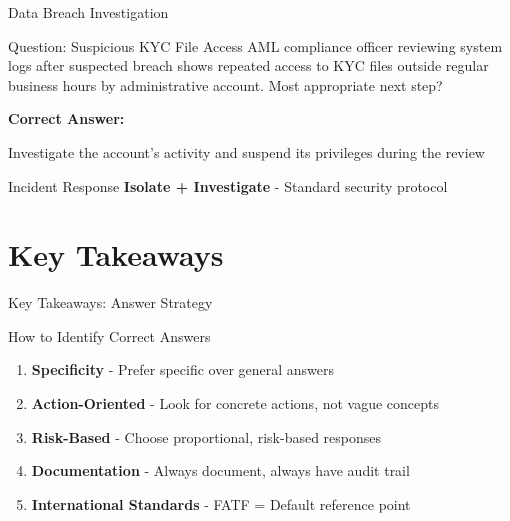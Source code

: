 \documentclass{beamer}
\begin{document}
\begin{frame}{Data Breach Investigation}
\begin{block}{Question: Suspicious KYC File Access}
\small{AML compliance officer reviewing system logs after suspected breach shows repeated access to KYC files outside regular business hours by administrative account. Most appropriate next step?}
\end{block}

\vspace{0.3cm}
\textcolor{correct}{\textbf{Correct Answer:}}
\begin{center}
\Large{Investigate the account's activity and suspend its privileges during the review}
\end{center}

\begin{block}{Incident Response}
\textbf{Isolate + Investigate} - Standard security protocol
\end{block}
\end{frame}

\section{Key Takeaways}
\begin{frame}{Key Takeaways: Answer Strategy}
\begin{block}{How to Identify Correct Answers}
\begin{enumerate}
    \item \textbf{Specificity} - Prefer specific over general answers
    \item \textbf{Action-Oriented} - Look for concrete actions, not vague concepts
    \item \textbf{Risk-Based} - Choose proportional, risk-based responses
    \item \textbf{Documentation} - Always document, always have audit trail
    \item \textbf{International Standards} - FATF = Default reference point
\end{enumerate}
\end{block}
\end{frame}
\end{document}
